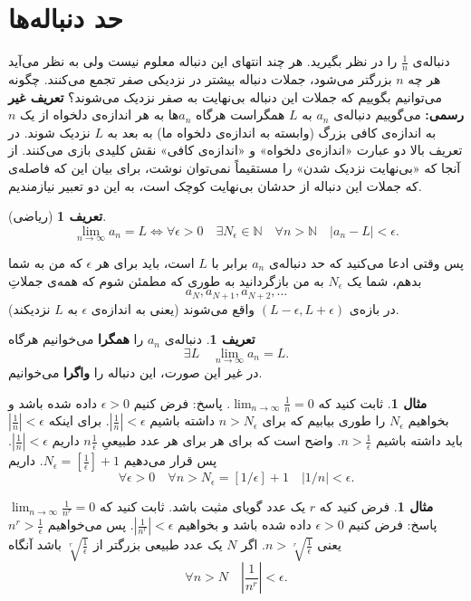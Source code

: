 \documentclass[12pt,a4paper]{article}
\theoremstyle{definition}
\newtheorem{mesal}[thm]{مثال}
\newtheorem{defn}[thm]{تعریف}
\begin{document}
\section*{حد دنباله‌ها}
دنباله‌ی
$\frac{1}{n}$
را در نظر بگیرید. هر چند انتهای این دنباله معلوم نیست ولی به نظر می‌آید هر چه
$n$
بزرگتر می‌شود، جملات دنباله بیشتر در نزدیکی صفر تجمع می‌کنند. چگونه می‌توانیم بگوییم که جملات این دنباله بی‌نهایت به صفر نزدیک می‌شوند؟
\newline
\textbf{تعریف غیر رسمی:}
می‌گوییم دنباله‌ی
$a_n$
به 
$L$
همگراست هرگاه 
$a_n$ها
به هر اندازه‌ی دلخواه از 
یک
$n$
به اندازه‌ی کافی بزرگ
 (وابسته به اندازه‌ی دلخواه ما)
 به بعد به 
$L$
نزدیک شوند.
\newline
در تعریف بالا دو عبارت «اندازه‌ی دلخواه» و «اندازه‌ی کافی» نقش کلیدی بازی می‌کنند. 
از آنجا که «بی‌نهایت نزدیک شدن» را مستقیماً نمی‌توان نوشت،
برای بیان این که فاصله‌ی که جملات این دنباله
از حدشان بی‌نهایت کوچک است، به این دو تعبیر نیازمندیم. 
\begin{defn}[ریاضی]
\[
\lim_{n \to \infty} a_n =L \iff \forall \epsilon>0\quad \exists  N_\epsilon\in \mathbb{N} \quad \forall n > \mathbb{N} \quad |a_n-L|<\epsilon.
\]
\end{defn}
پس وقتی ادعا می‌کنید که حد دنباله‌ی
$a_n$
برابر با
$L$
است، باید برای هر 
$\epsilon$
که من به شما بدهم، شما یک
$N_\epsilon$
به من بازگردانید به طوری که مطمئن شوم که همه‌ی جملاتِ
\[
a_N,a_{N+1},a_{N+2},\ldots
\]
در بازه‌ی
$(L-\epsilon,L+\epsilon)$
واقع می‌شوند (يعنی به اندازه‌ی
$\epsilon$
به
$L$
نزدیکند).
\begin{defn}
دنباله‌ی
$a_n$
را \textbf{همگرا} می‌خوانیم هرگاه
\[\exists L \quad \lim_{n \to \infty} a_n = L.\]
در غیر این صورت، این دنباله را \textbf{واگرا} 
می‌خوانیم. 
\end{defn}
\begin{mesal}
ثابت کنید که 
$\lim_{n \to \infty} \frac{1}{n}=0$.
\newline
پاسخ:
فرض کنیم 
$\epsilon >0$
داده شده باشد و بخواهیم 
$N_\epsilon$
را طوری بیابیم که برای 
$n>N_\epsilon$
داشته باشیم
$|\frac{1}{n}|<\epsilon$.
برای اینکه 
$|\frac{1}{n}|<\epsilon$
باید داشته باشیم
$n>\frac{1}{\epsilon}$.
واضح است که برای هر برای هر عدد طبیعیِ
$n \frac{1}{\epsilon}$
داریم
$ |\frac{1}{n}|<\epsilon$.
پس قرار می‌دهیم
$N_\epsilon=[\frac{1}{\epsilon}]+1$.
داریم
\[
\forall \epsilon>0 \quad \forall n>N_\epsilon=[1/\epsilon]+1
\quad |1/n|<\epsilon.\]
\end{mesal}
\begin{mesal}
فرض کنید که
$r$
یک عدد گویای مثبت باشد.
ثابت کنید که 
$\lim_{n \to \infty} \frac{1}{n^r}=0$
\newline
پاسخ:
فرض کنیم 
$\epsilon >0$
داده شده باشد و بخواهیم 
$|\frac{1}{n^r}|<\epsilon$.
پس می‌خواهیم 
$n^r>\frac{1}{\epsilon}$
یعنی
$n>\sqrt[r]{\frac{1}{\epsilon}}$.
اگر
$N$
یک عدد طبیعی بزرگتر از 
$\sqrt[r]{\frac{1}{\epsilon}}$
باشد آنگاه
\[
\forall n>N \quad |\frac{1}{n^r}|<\epsilon.
\]
\end{mesal}
\end{document}
